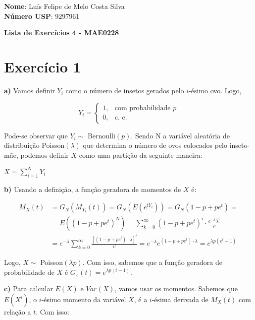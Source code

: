 \documentclass[12pt,letterpaper]{article}
\begin{document}
	
	\textbf{Nome}: Luís Felipe de Melo Costa Silva \\
	\textbf{Número USP}: 9297961 
	
	\begin{center}
		\LARGE \bf
		Lista de Exercícios 4 - MAE0228
	\end{center}
	
	\section*{Exercício 1}
	
	\textbf{a)} Vamos definir $Y_i$ como o número de insetos gerados pelo $i$-ésimo ovo. Logo, 
	
	 \begin{equation*}
		 Y_i=
			 \begin{cases}
			 1, & \text{com probabilidade } p  \\
			 0, & \text{c. c.}
			 \end{cases}
	 \end{equation*}
	 
	 Pode-se observar que $Y_i \sim$ Bernoulli$(p)$. Sendo N a variável aleatória de distribuição Poisson$(\lambda)$ que determina o número de ovos colocados pelo inseto-mãe, podemos definir $X$ como uma partição da seguinte maneira:
	 
	 \begin{center}
	 	$X =\sum_{i=1}^{N} Y_i$
	 \end{center}
	 
	 \textbf{b)} Usando a definição, a função geradora de momentos de $X$ é:
	 
	 \begin{equation*}
		 \begin{split}
			 M_X(t) & = G_N(M_{Y_i}(t)) = G_N(E(e^{tY_i})) = G_N(1 - p + pe^t) = \\
			 & = E((1 - p + pe^t)^N) = \sum_{k=0}^{\infty} (1 - p + pe^t)^i \cdot \frac{e^{-\lambda} \lambda^i}{i!} = \\
			 & = e^{-\lambda} \sum_{k=0}^{\infty} \frac{[(1 - p + pe^t)\cdot\lambda]^i}{i!} = e^{-\lambda} e^{(1 - p + pe^t)\cdot\lambda} = e^{\lambda p (e^t -1)}
		 \end{split}
	 \end{equation*}
	 
	 Logo, $X \sim$ Poisson$(\lambda p)$. Com isso, sabemos que a função geradora de probabilidade de $X$ é $G_x(t) = e^{\lambda p (t -1)}$.
	 
	 \textbf{c)} Para calcular $ E(X) $ e $ Var(X) $, vamos usar os momentos. Sabemos que $ E(X^i) $, o $ i $-ésimo momento da variável $ X $, é a $ i $-ésima derivada de $ M_X(t) $ com relação a $ t $. Com isso:
	 
\end{document}
